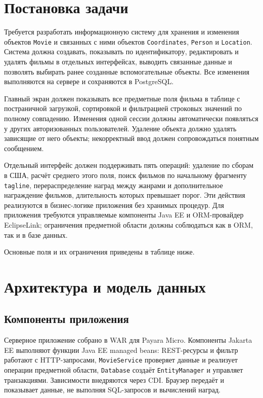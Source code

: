 \section{Постановка задачи}

Требуется разработать информационную систему для хранения и изменения объектов \texttt{Movie} и связанных с ними объектов \texttt{Coordinates}, \texttt{Person} и \texttt{Location}. Система должна создавать, показывать по идентификатору, редактировать и удалять фильмы в отдельных интерфейсах, выводить связанные данные и позволять выбирать ранее созданные вспомогательные объекты. Все изменения выполняются на сервере и сохраняются в PostgreSQL.

Главный экран должен показывать все предметные поля фильма в таблице с постраничной загрузкой, сортировкой и фильтрацией строковых значений по полному совпадению. Изменения одной сессии должны автоматически появляться у других авторизованных пользователей. Удаление объекта должно удалять зависящие от него объекты; некорректный ввод должен сопровождаться понятным сообщением.

Отдельный интерфейс должен поддерживать пять операций: удаление по сборам в США, расчёт среднего этого поля, поиск фильмов по начальному фрагменту \texttt{tagline}, перераспределение наград между жанрами и дополнительное награждение фильмов, длительность которых превышает порог. Эти действия реализуются в бизнес-логике приложения без хранимых процедур. Для приложения требуются управляемые компоненты Java EE и ORM-провайдер EclipseLink; ограничения предметной области должны соблюдаться как в ORM, так и в базе данных.

Основные поля и их ограничения приведены в таблице ниже.
\begingroup\small

\endgroup

\section{Архитектура и модель данных}
\subsection{Компоненты приложения}

Серверное приложение собрано в WAR для Payara Micro. Компоненты Jakarta EE выполняют функции Java EE managed beans: REST-ресурсы и фильтр работают с HTTP-запросами, \texttt{MovieService} проверяет данные и реализует операции предметной области, \texttt{Database} создаёт \texttt{EntityManager} и управляет транзакциями. Зависимости внедряются через CDI. Браузер передаёт и показывает данные, не выполняя SQL-запросов и вычислений наград.

